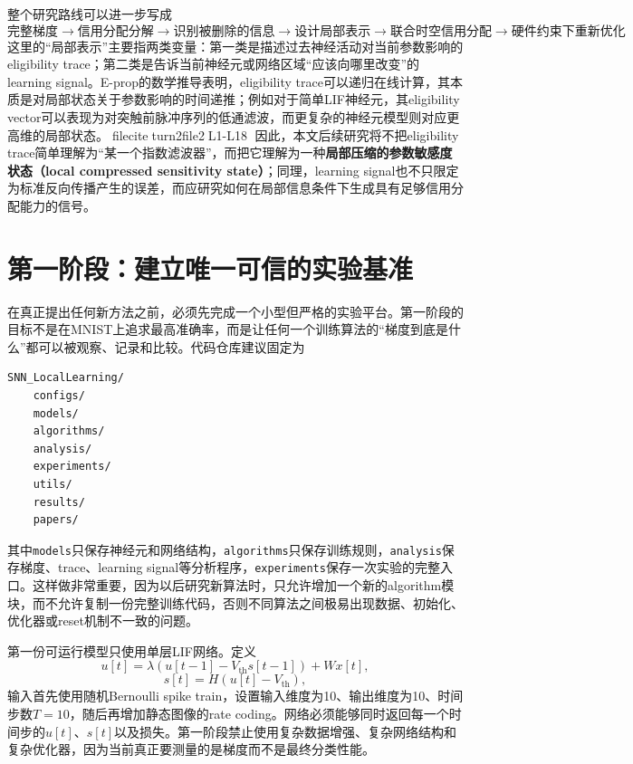 \documentclass[journal,12pt,onecolumn]{IEEEtran}
\begin{document}
整个研究路线可以进一步写成
\begin{equation}
\boxed{
\text{完整梯度}
\rightarrow
\text{信用分配分解}
\rightarrow
\text{识别被删除的信息}
\rightarrow
\text{设计局部表示}
\rightarrow
\text{联合时空信用分配}
\rightarrow
\text{硬件约束下重新优化}
}.
\end{equation}
这里的“局部表示”主要指两类变量：第一类是描述过去神经活动对当前参数影响的eligibility trace；第二类是告诉当前神经元或网络区域“应该向哪里改变”的learning signal。E-prop的数学推导表明，eligibility trace可以递归在线计算，其本质是对局部状态关于参数影响的时间递推；例如对于简单LIF神经元，其eligibility vector可以表现为对突触前脉冲序列的低通滤波，而更复杂的神经元模型则对应更高维的局部状态。fileciteturn2file2L1-L18 因此，本文后续研究将不把eligibility trace简单理解为“某一个指数滤波器”，而把它理解为一种\textbf{局部压缩的参数敏感度状态（local compressed sensitivity state）}；同理，learning signal也不只限定为标准反向传播产生的误差，而应研究如何在局部信息条件下生成具有足够信用分配能力的信号。

\section{第一阶段：建立唯一可信的实验基准}

在真正提出任何新方法之前，必须先完成一个小型但严格的实验平台。第一阶段的目标不是在MNIST上追求最高准确率，而是让任何一个训练算法的“梯度到底是什么”都可以被观察、记录和比较。代码仓库建议固定为
\begin{verbatim}
SNN_LocalLearning/
    configs/
    models/
    algorithms/
    analysis/
    experiments/
    utils/
    results/
    papers/
\end{verbatim}
其中\verb|models|只保存神经元和网络结构，\verb|algorithms|只保存训练规则，\verb|analysis|保存梯度、trace、learning signal等分析程序，\verb|experiments|保存一次实验的完整入口。这样做非常重要，因为以后研究新算法时，只允许增加一个新的algorithm模块，而不允许复制一份完整训练代码，否则不同算法之间极易出现数据、初始化、优化器或reset机制不一致的问题。

第一份可运行模型只使用单层LIF网络。定义
\begin{equation}
u[t]=\lambda\left(u[t-1]-V_{\mathrm{th}}s[t-1]\right)+Wx[t],
\end{equation}
\begin{equation}
s[t]=H(u[t]-V_{\mathrm{th}}),
\end{equation}
输入首先使用随机Bernoulli spike train，设置输入维度为10、输出维度为10、时间步数$T=10$，随后再增加静态图像的rate coding。网络必须能够同时返回每一个时间步的$u[t]$、$s[t]$以及损失。第一阶段禁止使用复杂数据增强、复杂网络结构和复杂优化器，因为当前真正要测量的是梯度而不是最终分类性能。
\end{document}
